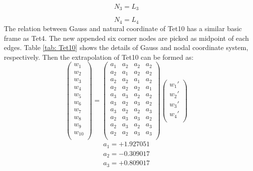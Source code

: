 \begin{equation}
N_3 = L_3
\end{equation}

\begin{equation}
N_4 = L_4
\end{equation}
\clearpage
The relation between Gauss and natural coordinate of Tet10 has a similar basic frame as Tet4. The new appended six corner nodes are picked as midpoint of each edges. Table \ref{tab: Tet10} shows the details of Gauss and nodal coordinate system, respectively. Then the extrapolation of Tet10 can be formed as:
\begin{equation}
\begin{pmatrix}
w_1 \\
w_2 \\
w_3 \\
w_4 \\
w_5 \\
w_6 \\
w_7 \\
w_8 \\
w_9 \\
w_{10} \\
\end{pmatrix} = \begin{pmatrix}
a_1 & a_2 &  a_2 &  a_2      \\[0.3em]
a_2 & a_1 &  a_2 &  a_2      \\[0.3em]
a_2 & a_2 &  a_1 &  a_2      \\[0.3em]
a_2 & a_2 &  a_2 &  a_1      \\[0.3em]
a_3 & a_3 &  a_2 &  a_2      \\[0.3em]
a_3 & a_2 &  a_3 &  a_2      \\[0.3em]
a_3 & a_2 &  a_2 &  a_3      \\[0.3em]
a_2 & a_3 &  a_3 &  a_2      \\[0.3em]
a_2 & a_3 &  a_2 &  a_3      \\[0.3em]
a_2 & a_2 &  a_3 &  a_3      \\[0.3em]
\end{pmatrix} \begin{pmatrix}
{w_1}' \\
{w_2}' \\
{w_3}' \\
{w_4}' \\
\end{pmatrix}
\end{equation}	
\begin{align*}
a_1 = +1.927051 \\
a_2 = -0.309017 \\
a_3 = +0.809017
\end{align*}

